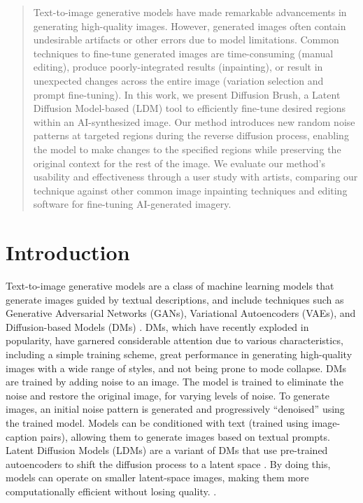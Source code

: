 \documentclass[10pt,twocolumn,letterpaper]{article}
\begin{document}

\begin{abstract}

  Text-to-image generative models have made remarkable advancements in generating high-quality images. However, generated images often contain undesirable artifacts or other errors due to model limitations. Common techniques to fine-tune generated images are time-consuming (manual editing), produce poorly-integrated results (inpainting), or result in unexpected changes across the entire image (variation selection and prompt fine-tuning). In this work, we present Diffusion Brush, a Latent Diffusion Model-based (LDM) tool to efficiently fine-tune desired regions within an AI-synthesized image. Our method introduces new random noise patterns at targeted regions during the reverse diffusion process, enabling the model to make changes to the specified regions while preserving the original context for the rest of the image. We evaluate our method's usability and effectiveness through a user study with artists, comparing our technique against other common image inpainting techniques and editing software for fine-tuning AI-generated imagery.
\end{abstract}


\section{Introduction} \label{sec:intro}
Text-to-image generative models are a class of machine learning models that generate images guided by textual descriptions, and include techniques such as Generative Adversarial Networks (GANs), Variational Autoencoders (VAEs), and Diffusion-based Models (DMs) \cite{zhang2023text}. DMs, which have recently exploded in popularity, have garnered considerable attention due to various characteristics, including a simple training scheme, great performance in generating high-quality images with a wide range of styles, and not being prone to mode collapse. DMs are trained by adding noise to an image. The model is trained to eliminate the noise and restore the original image, for varying levels of noise. To generate images, an initial noise pattern is generated and progressively ``denoised'' using the trained model. Models can be conditioned with text (trained using image-caption pairs), allowing them to generate images based on textual prompts. Latent Diffusion Models (LDMs) are a variant of DMs that use pre-trained autoencoders to shift the diffusion process to a latent space \cite{rombach2022high}. By doing this, models can operate on smaller latent-space images, making them more computationally efficient without losing quality. \cite{ho2022cascaded}.
\end{document}
